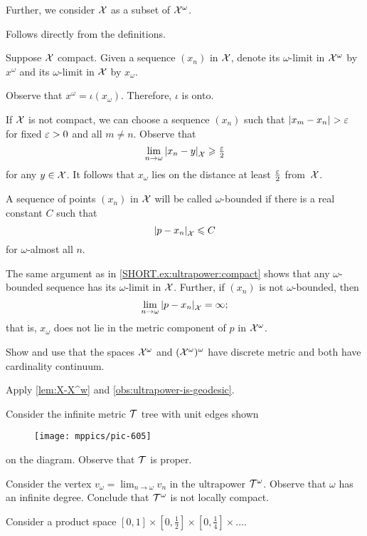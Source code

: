 Further, we consider $\mathcal{X}$ as a subset of $\mathcal{X}^\omega$.

 Follows directly from the definitions.

Suppose $\mathcal{X}$ compact.
Given a sequence $(x_n)$ in $\mathcal{X}$, denote its $\omega$-limit in $\mathcal{X}^\omega$ by $x^\omega$ and its $\omega$-limit in $\mathcal{X}$ by $x_\omega$.

Observe that $x^\omega=\iota(x_\omega)$.
Therefore, $\iota$ is onto.

If $\mathcal{X}$ is not compact, we can choose a sequence $(x_n)$ such that $\dist{x_m}{x_n}{}>\eps$ for fixed $\varepsilon>0$ and all $m\ne n$.
Observe that
\[\lim_{n\to\omega}\dist{x_n}{y}{\spc{X}}\ge \tfrac\eps2\]
for any $y\in\mathcal{X}$.
It follows that $x_\omega$ lies on the distance at least $\tfrac{\varepsilon}2$ from~$\mathcal{X}$.

A sequence of points $(x_n)$ in $\mathcal{X}$ will be called $\omega$-bounded if there is a real constant $C$ such that
\[\dist{p}{x_n}{\spc{X}}\le C\] 
for $\omega$-almost all $n$.

The same argument as in \ref{SHORT.ex:ultrapower:compact} shows that any $\omega$-bounded sequence has its $\omega$-limit in $\mathcal{X}$.
Further, if $(x_n)$ is not  $\omega$-bounded, then 
\[\lim_{n\to\omega}\dist{p}{x_n}{\spc{X}}=\infty;\]
that is, $x_\omega$ does not lie in the metric component of $p$ in $\mathcal{X}^\omega$.

 Show and use that the spaces $\mathcal{X}^\omega$ and $(\mathcal{X}^\omega)^\omega$ have discrete metric and both have cardinality continuum.

Apply \ref{lem:X-X^w} and \ref{obs:ultrapower-is-geodesic}.

 Consider the infinite metric $\mathcal{T}$ tree with unit edges shown
\begin{figure}[h!]
\vskip-0mm
\centering
\texttt{[image: mppics/pic-605]}
\end{figure}
on the diagram. Observe that $\mathcal{T}$ is proper.

Consider the vertex $v_\omega=\lim_{n\to\omega}v_n$ in the ultrapower $\mathcal{T}^\omega$.
Observe that $\omega$ has an infinite degree.
Conclude that $\mathcal{T}^\omega$ is not locally compact.

 Consider a product space $[0,1]\times[0,\tfrac12]\times[0,\tfrac14]\times\dots$.

